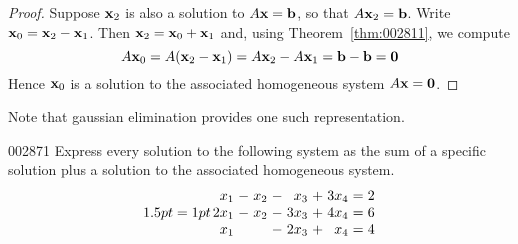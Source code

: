 \begin{proof}
Suppose $\textbf{x}_{2}$ is also a solution to $A\textbf{x} = \textbf{b}$, so that $A\textbf{x}_{2} = \textbf{b}$. Write $\textbf{x}_{0} = \textbf{x}_{2} - \textbf{x}_{1}$. Then $\textbf{x}_{2} = \textbf{x}_{0} + \textbf{x}_{1}$ and, using Theorem~\ref{thm:002811}, we compute
\begin{equation*}
A\textbf{x}_{0} = A(\textbf{x}_{2} - \textbf{x}_{1}) = A\textbf{x}_{2} - A\textbf{x}_{1} = \textbf{b} - \textbf{b} = \textbf{0}
\end{equation*}
Hence $\textbf{x}_{0}$ is a solution to the associated homogeneous system $A\textbf{x} = \textbf{0}$.
\end{proof}

\noindent Note that gaussian elimination provides one such representation.

\begin{example}{}{002871}
Express every solution to the following system as the sum of a specific solution plus a solution to the associated homogeneous system.
\begin{equation*}
\arraycolsep=1pt
\begin{array}{rrrrrrrrr}
x_{1} & - & x_{2} & - & x_{3} & + & 3x_{4} & = & 2 \\
2x_{1} & - & x_{2} & - & 3x_{3}&  + & 4x_{4} & = & 6 \\
x_{1} & & & - & 2x_{3} & + & x_{4} & = & 4
\end{array}
\end{equation*}


\end{example}
